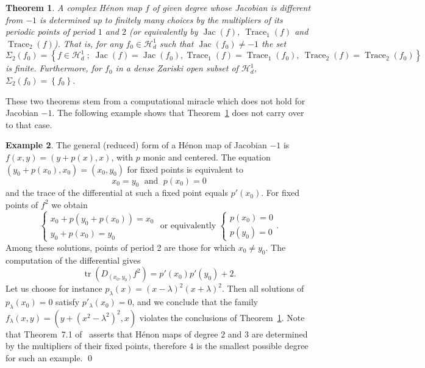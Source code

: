 \documentclass[oneside, 12pt]{amsart}
\newcommand{\set}[1]{\left\{#1\right\}}
\DeclareMathOperator{\tr}{tr}
\DeclareMathOperator{\jac}{Jac}
\DeclareMathOperator{\Trace}{Trace}
\theoremstyle{plain}
\newtheorem{thm}{Theorem}[section]
\theoremstyle{definition}
\newtheorem{eg}[thm]{Example}
\numberwithin{equation}{section}       %
\numberwithin{equation}{section}       %
\begin{document}
\begin{thm}\label{thm:henon_huguin2}
A complex Hénon map $f$ of given degree
 whose Jacobian is different from $-1$ is determined up to finitely many choices by 
the multipliers of its periodic points of period $1$ and $2$ (or equivalently by $\jac(f)$, $\Trace_1(f)$ and $\Trace_2(f)$). That is, for any $f_0\in \mathcal H^1_d$ such that $\jac(f_0)\neq -1$ the set 
$$ \Sigma_2(f_0)= \set{f\in \mathcal H^1_d\; ; \;  \jac(f)=\jac(f_0),  \Trace_1(f)=\Trace_1(f_0), \ 
\Trace_2(f)=\Trace_2(f_0)}$$ is finite.  
Furthermore, for  $f_0$ in a dense Zariski open subset of $\mathcal H^1_d$, $\Sigma_2(f_0)   = \set{f_0}$. 
\end{thm}




These two theorems stem from a computational miracle which does not hold for  
Jacobian $-1$. %
The following example shows that 
Theorem~\ref{thm:henon_huguin2} does not carry over to that case.

\begin{eg}\label{eg:jacobian-1}
The general (reduced) form of a Hénon map of Jacobian $-1$ is 
$f(x,y) = (y+p(x), x)$, with $p$ monic and centered. The equation 
$(y_0+p(x_0), x_0)  = (x_0, y_0)$ for fixed points  is equivalent to   
\begin{equation}
x_0=y_0 \;  {\text{ and }} \; p(x_0) = 0 
\end{equation}
and the trace of the differential at such a fixed point equals $p'(x_0)$. For fixed points of $f^2$ we obtain 
\begin{equation}
\begin{cases} x_0+p(y_0 + p(x_0) ) = x_0 \\
 y_0+p(x_0) = y_0
 \end{cases}  
{\text{ or equivalently }} 
 \begin{cases}  p(x_0) = 0 \\ p(y_0) = 0\end{cases} .
\end{equation}
Among these solutions, points of period 2 are those for which $x_0\neq y_0$. The computation of the differential gives
\begin{equation}
\tr (D_{(x_0, y_0)}f^2 )= p'(x_0)p'(y_0)+2.
\end{equation}
 Let us choose for instance $p_\lambda(x) = (x -\lambda)^2(x+\lambda)^2$. Then all solutions of 
 $p_\lambda (x_0) = 0$ satisfy 
   $p'_\lambda(x_0)=0$, and we conclude that the family 
   $f_\lambda(x,y) = (y+ (x^2-\lambda^2)^2, x)$ %
   violates the conclusions of Theorem~\ref{thm:henon_huguin2}. Note that 
Theorem~7.1 of~\cite{friedland-milnor} asserts that Hénon maps of degree $2$ and $3$ are determined by the multipliers of their fixed points, therefore  $4$ is the smallest possible degree for such an example.   \qed 
\end{eg}
\end{document}
